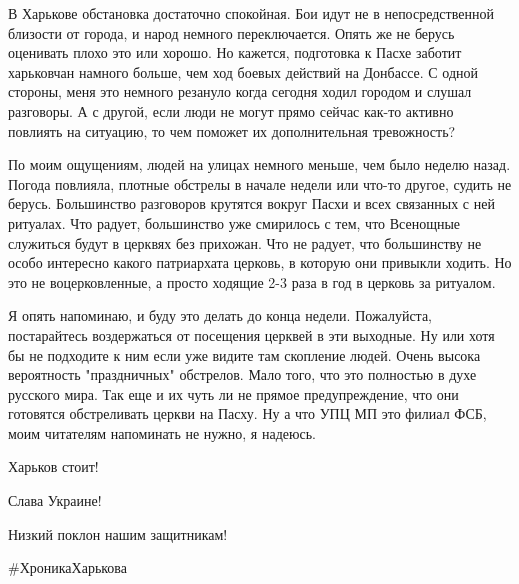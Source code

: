 В Харькове обстановка достаточно спокойная. Бои идут не в непосредственной
близости от города, и народ немного переключается. Опять же не берусь оценивать
плохо это или хорошо. Но кажется, подготовка к Пасхе заботит харьковчан намного
больше, чем ход боевых действий на Донбассе. С одной стороны, меня это немного
резануло когда сегодня ходил городом и слушал разговоры. А с другой, если люди
не могут прямо сейчас как-то активно повлиять на ситуацию, то чем поможет их
дополнительная тревожность? 

По моим ощущениям, людей на улицах немного меньше, чем было неделю назад.
Погода повлияла, плотные обстрелы в начале недели или что-то другое, судить не
берусь. Большинство разговоров крутятся вокруг Пасхи и всех связанных с ней
ритуалах. Что радует, большинство уже смирилось с тем, что Всенощные служиться
будут в церквях без прихожан. Что не радует, что большинству не особо интересно
какого патриархата церковь, в которую они привыкли ходить. Но это не
воцерковленные, а просто ходящие 2-3 раза в год в церковь за ритуалом. 

Я опять напоминаю, и буду это делать до конца недели. Пожалуйста, постарайтесь
воздержаться от посещения церквей в эти выходные. Ну или хотя бы не подходите к
ним если уже видите там скопление людей. Очень высока вероятность "праздничных"
обстрелов. Мало того, что это полностью в духе русского мира. Так еще и их чуть
ли не прямое предупреждение, что они готовятся обстреливать церкви на Пасху. Ну
а что УПЦ МП это филиал ФСБ, моим читателям напоминать не нужно, я надеюсь. 

Харьков стоит!

Слава Украине!

Низкий поклон нашим защитникам!

\#ХроникаХарькова

